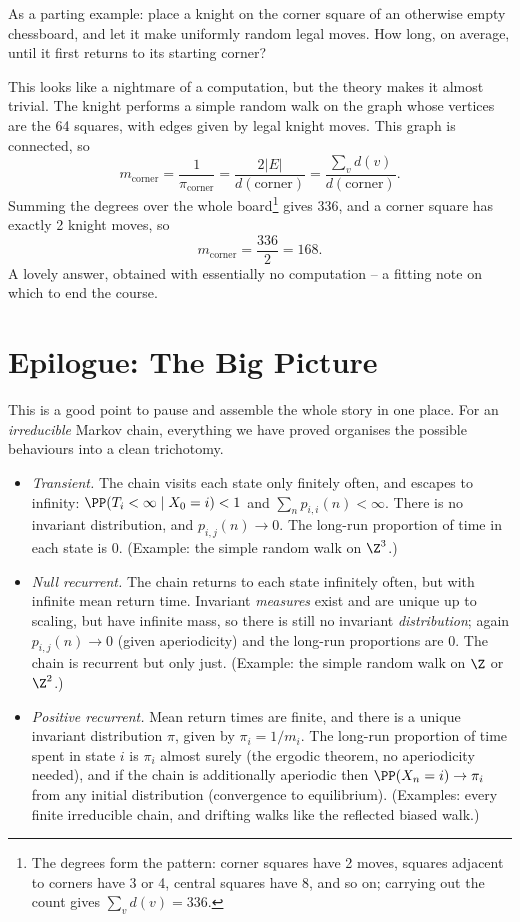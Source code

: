 \documentclass[a4paper]{scrartcl}
\begin{document}
\begin{example}
	As a parting example: place a knight on the corner square of an otherwise empty chessboard, and let it make uniformly random legal moves. How long, on average, until it first returns to its starting corner?

	This looks like a nightmare of a computation, but the theory makes it almost trivial. The knight performs a simple random walk on the graph whose vertices are the 64 squares, with edges given by legal knight moves. This graph is connected, so
	$$
	m_{\text{corner}} = \frac{1}{\pi_{\text{corner}}} = \frac{2|E|}{d(\text{corner})} = \frac{\sum_v d(v)}{d(\text{corner})}.
	$$
	Summing the degrees over the whole board\footnote{The degrees form the pattern: corner squares have 2 moves, squares adjacent to corners have 3 or 4, central squares have 8, and so on; carrying out the count gives $\sum_v d(v) = 336$.} gives $336$, and a corner square has exactly 2 knight moves, so
	$$
	m_{\text{corner}} = \frac{336}{2} = 168.
	$$
	A lovely answer, obtained with essentially no computation -- a fitting note on which to end the course.
\end{example}

\section*{Epilogue: The Big Picture}

This is a good point to pause and assemble the whole story in one place. For an \emph{irreducible} Markov chain, everything we have proved organises the possible behaviours into a clean trichotomy.

\begin{itemize}
	\item \emph{Transient.} The chain visits each state only finitely often, and escapes to infinity: $\PP(T_i < \infty \mid X_0 = i) < 1$ and $\sum_n p_{i,i}(n) < \infty$. There is no invariant distribution, and $p_{i, j}(n) \rightarrow 0$. The long-run proportion of time in each state is 0. (Example: the simple random walk on $\Z^3$.)
	\item \emph{Null recurrent.} The chain returns to each state infinitely often, but with infinite mean return time. Invariant \emph{measures} exist and are unique up to scaling, but have infinite mass, so there is still no invariant \emph{distribution}; again $p_{i, j}(n) \rightarrow 0$ (given aperiodicity) and the long-run proportions are 0. The chain is recurrent but only just. (Example: the simple random walk on $\Z$ or $\Z^2$.)
	\item \emph{Positive recurrent.} Mean return times are finite, and there is a unique invariant distribution $\pi$, given by $\pi_i = 1/m_i$. The long-run proportion of time spent in state $i$ is $\pi_i$ almost surely (the ergodic theorem, no aperiodicity needed), and if the chain is additionally aperiodic then $\PP(X_n = i) \rightarrow \pi_i$ from any initial distribution (convergence to equilibrium). (Examples: every finite irreducible chain, and drifting walks like the reflected biased walk.)
\end{itemize}
\end{document}
